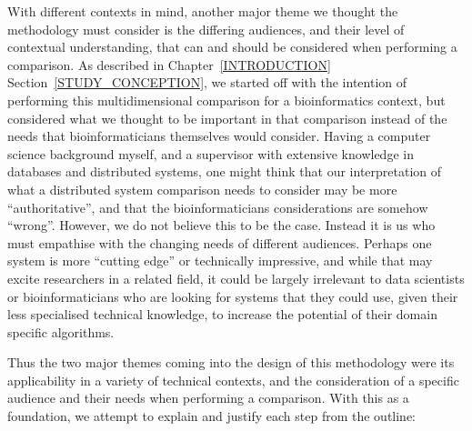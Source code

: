   With different contexts in mind, another major theme we thought the methodology must consider is the differing audiences, and their level of contextual understanding, that can and should be considered when performing a comparison. As described in Chapter~\ref{INTRODUCTION} Section~\ref{STUDY_CONCEPTION}, we started off with the intention of performing this multidimensional comparison for a bioinformatics context, but considered what we thought to be important in that comparison instead of the needs that bioinformaticians themselves would consider. Having a computer science background myself, and a supervisor with extensive knowledge in databases and distributed systems, one might think that our interpretation of what a distributed system comparison needs to consider may be more ``authoritative'', and that the bioinformaticians considerations are somehow ``wrong''. However, we do not believe this to be the case. Instead it is us who must empathise with the changing needs of different audiences. Perhaps one system is more ``cutting edge'' or technically impressive, and while that may excite researchers in a related field, it could be largely irrelevant to data scientists or bioinformaticians who are looking for systems that they could use, given their less specialised technical knowledge, to increase the potential of their domain specific algorithms.

  Thus the two major themes coming into the design of this methodology were its applicability in a variety of technical contexts, and the consideration of a specific audience and their needs when performing a comparison. With this as a foundation, we attempt to explain and justify each step from the outline:

